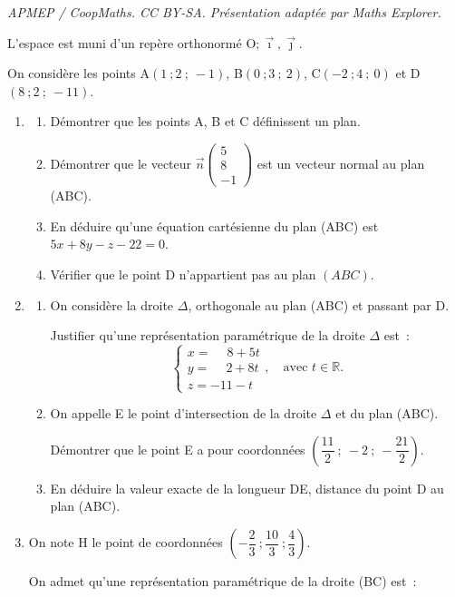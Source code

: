 \documentclass[10pt]{article}
\providecommand{\R}{\mathbb{R}}
\providecommand{\vect}[1]{\overrightarrow{#1}}
\providecommand{\Oij}{\(\mathrm{O};\vec{\imath},\vec{\jmath}\)}
\begin{document}
\noindent\textit{APMEP / CoopMaths. CC BY-SA. Présentation adaptée par Maths Explorer.}\par\medskip
L'espace est muni d'un repère orthonormé \Oij.

On considère les points A$(1~;2~;~-1)$, B$(0~;3~;~2)$, C$(-2~;4~;~0)$ et D$(8~;2~;~-11)$.

\begin{enumerate}
\item
\begin{enumerate}[label=\textbf{\alph*.}]
\item Démontrer que les points A, B et C définissent un plan.
\item Démontrer que le vecteur $\vect{n}\begin{pmatrix}5\\8\\-1\end{pmatrix}$ est un vecteur normal au plan (ABC).
\item En déduire qu'une équation cartésienne du plan (ABC) est $5x+ 8y - z - 22 = 0$.
\item Vérifier que le point D n'appartient pas au plan $(ABC)$.
\end{enumerate}

\item
	\begin{enumerate}[label=\textbf{\alph*.}]
		\item On considère la droite $\Delta$, orthogonale au plan (ABC) et passant par D.

Justifier qu'une représentation paramétrique de la droite $\Delta$ est~:
\[
\begin{cases}
x = \phantom{-}8+ 5t\\
y = \phantom{-}2+ 8t\\
z = -11- t
\end{cases}, \quad \text{avec } t \in \R.
\]
		\item On appelle E le point d'intersection de la droite $\Delta$ et du plan (ABC).

Démontrer que le point E a pour coordonnées $\left(\dfrac{11}{2}~;~-2~;~-\dfrac{21}{2}\right)$.
		\item En déduire la valeur exacte de la longueur DE, distance du point D au plan (ABC).
	\end{enumerate}
\item On note H le point de coordonnées $\left(-\dfrac{2}{3}~;\dfrac{10}{3}~;\dfrac{4}{3}\right)$.

On admet qu'une représentation paramétrique de la droite (BC) est~:


\end{enumerate}
\end{document}
